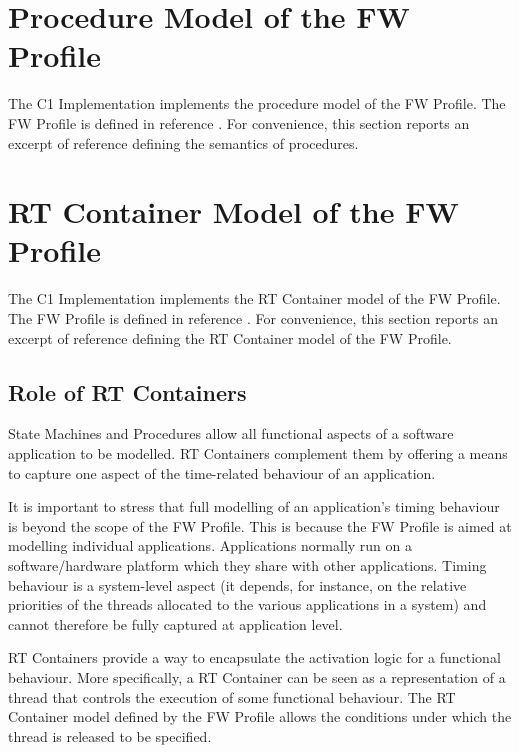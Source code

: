 \documentclass[a4paper,10pt]{article}
\let\stdsection\section
\renewcommand\section{\newpage\stdsection}
\begin{document}

\section{Procedure Model of the FW Profile}\label{sec:prModel}
The C1 Implementation implements the procedure model of the FW Profile. The FW Profile is defined in reference \cite{ref:fwprofile}. For convenience, this section reports an excerpt of reference \cite{ref:fwprofile} defining the semantics of procedures.




\section{RT Container Model of the FW Profile}\label{sec:rtContainerModel}
The C1 Implementation implements the RT Container model of the FW Profile. The FW Profile is defined in reference \cite{ref:fwprofile}. For convenience, this section reports an excerpt of reference \cite{ref:fwprofile} defining the RT Container model of the FW Profile.

\subsection{Role of RT Containers}
State Machines and Procedures allow all functional aspects of a software application to be modelled. RT Containers complement them by offering a means to capture one aspect of the time-related behaviour of an application.

It is important to stress that full modelling of an application's timing behaviour is beyond the scope of the FW Profile. This is because the FW Profile is aimed at modelling individual applications. Applications normally run on a software/hardware platform which they share with other applications. Timing behaviour is a system-level aspect (it depends, for instance, on the relative priorities of the threads allocated to the various applications in a system) and cannot therefore be fully captured at application level.

RT Containers provide a way to encapsulate the activation logic for a functional behaviour. More specifically, a RT Container can be seen as a representation of a thread that controls the execution of some functional behaviour. The RT Container model defined by the FW Profile allows the conditions under which the thread is released to be specified.
\end{document}
